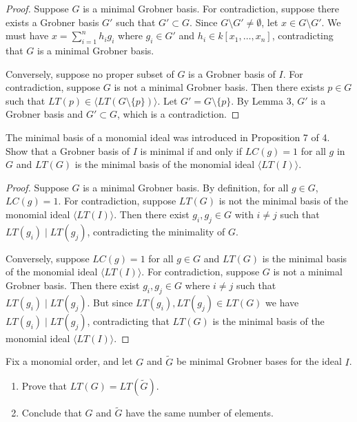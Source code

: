 \begin{proof}
    Suppose $G$ is a minimal Grobner basis.
    For contradiction, suppose there exists a Grobner basis $G'$ such that $G' \subset G$.
    Since $G \setminus G' \ne \emptyset$, let $x \in G \setminus G'$. 
    We must have $x = \sum_{i = 1}^{n} h_i g_i$ where $g_i \in G'$ and $h_i \in k[x_1, \ldots, x_n]$,
        contradicting that $G$ is a minimal Grobner basis.

    Conversely, suppose no proper subset of $G$ is a Grobner basis of $I$.
    For contradiction, suppose $G$ is not a minimal Grobner basis.
    Then there exists $p \in G$ such that $LT(p) \in \langle LT(G \setminus \{p\}) \rangle$.
    Let $G' = G \setminus \{p\}$. By Lemma 3, $G'$ is a Grobner basis and $G' \subset G$, which is a contradiction.
\end{proof}

\begin{tcolorbox}[title=Problem 6, breakable]
    The minimal basis of a monomial ideal was introduced 
    in Proposition 7 of 4. Show that a Grobner basis 
    of $I$ is minimal if and only if $LC(g) = 1$ for all 
    $g$ in $G$ and $LT(G)$ is the minimal basis of the 
    monomial ideal $\langle LT(I) \rangle$.
\end{tcolorbox}

\begin{proof}
    Suppose $G$ is a minimal Grobner basis.
    By definition, for all $g \in G$, $LC(g) = 1$.
    For contradiction, suppose $LT(G)$ is not the minimal basis of the monomial ideal $\langle LT(I) \rangle$.
    Then there exist $g_i, g_j \in G$ with $i \ne j$ such that $LT(g_i) \mid LT(g_j)$, contradicting the minimality of $G$.

    Conversely, suppose $LC(g) = 1$ for all $g \in G$ and $LT(G)$ is the minimal basis of the monomial ideal 
        $\langle LT(I) \rangle$.
    For contradiction, suppose $G$ is not a minimal Grobner basis.
    Then there exist $g_i, g_j \in G$ where $i \ne j$ such that $LT(g_i) \mid LT(g_j)$.
    But since $LT(g_i), LT(g_j) \in LT(G)$ we have $LT(g_i) \mid LT(g_j)$, contradicting that $LT(G)$ is the minimal basis of the monomial ideal 
        $\langle LT(I) \rangle$.
\end{proof}


\begin{tcolorbox}[title=Problem 7, breakable]
    Fix a monomial order, and let $G$ and $\tilde{G}$
    be minimal Grobner bases for the ideal $I$.
    \begin{enumerate}
        \item Prove that $LT(G) = LT(\tilde{G})$.
        \item Conclude that $G$ and $\tilde{G}$ have the same number of elements.
    \end{enumerate}
\end{tcolorbox}

